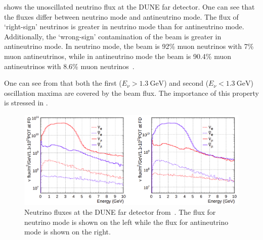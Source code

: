  shows the unoscillated neutrino flux at the DUNE far detector.
One can see that the fluxes differ between neutrino mode and antineutrino mode.
The flux of `right-sign' neutrinos is greater in neutrino mode than for antineutrino mode.
Additionally, the `wrong-sign' contamination of the beam is greater in antineutrino mode.
In neutrino mode, the beam is 92\% muon neutrinos with 7\% muon antineutrinos, while in antineutrino mode the beam is 90.4\% muon antineutrinos with 8.6\% muon neutrinos~\cite{tdrVol2}.

One can see from  that both the first ($E_{\nu} > \SI{1.3}{\giga\electronvolt}$) and second ($E_{\nu} < \SI{1.3}{\giga\electronvolt}$) oscillation maxima are covered by the beam flux.
The importance of this property is stressed in .

\begin{figure}[h]
  \centering
  \includegraphics[width=.95\linewidth]{files/figures/dune_detector/duneFDFlux}
  \caption[Neutrino fluxes at the DUNE far detector.]{Neutrino fluxes at the DUNE far detector from~\cite{tdrVol2}. The flux for neutrino mode is shown on the left while the flux for antineutrino mode is shown on the right.}
  \label{fig:fdFlux}
\end{figure}






